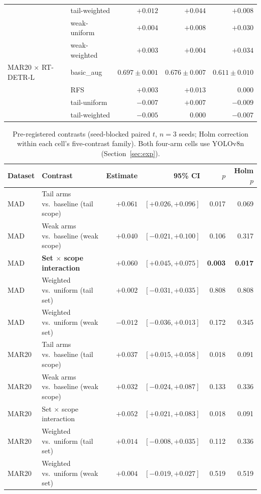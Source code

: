 \documentclass[preprint,12pt,authoryear]{elsarticle}
\begin{document}
\begin{table}[t]
\begin{tabular}{llrrr}
  & tail-weighted & $+0.012$ & $\mathbf{+0.044}$ & $+0.008$ \\
  & weak-uniform  & $+0.004$ & $+0.008$ & $\mathbf{+0.030}$ \\
  & weak-weighted & $+0.003$ & $+0.004$ & $\mathbf{+0.034}$ \\
\midrule
MAR20 $\times$ RT-DETR-L
  & basic\_aug    & $0.697\pm0.001$ & $0.676\pm0.007$ & $0.611\pm0.010$ \\
  & RFS           & $+0.003$ & $+0.013$ & $0.000$ \\
  & tail-uniform  & $-0.007$ & $\mathbf{+0.007}$ & $-0.009$ \\
  & tail-weighted & $-0.005$ & $\mathbf{0.000}$  & $-0.007$ \\
\bottomrule
\end{tabular}
\end{table}

\begin{table}[t]
\centering
\caption{Pre-registered contrasts (seed-blocked paired $t$, $n = 3$
seeds; Holm correction within each cell's five-contrast family). Both
four-arm cells use YOLOv8n (Section~\ref{sec:exp}).}
\label{tab:contrasts}
\small
\begin{tabular}{llrrrr}
\toprule
Dataset & Contrast & Estimate & 95\% CI & $p$ & Holm $p$ \\
\midrule
MAD & Tail arms vs.\ baseline (tail scope)  & $+0.061$ & $[+0.026, +0.096]$ & 0.017 & 0.069 \\
MAD & Weak arms vs.\ baseline (weak scope)  & $+0.040$ & $[-0.021, +0.100]$ & 0.106 & 0.317 \\
MAD & \textbf{Set $\times$ scope interaction} & $\mathbf{+0.060}$ & $\mathbf{[+0.045, +0.075]}$ & \textbf{0.003} & \textbf{0.017} \\
MAD & Weighted vs.\ uniform (tail set)    & $+0.002$ & $[-0.031, +0.035]$ & 0.808 & 0.808 \\
MAD & Weighted vs.\ uniform (weak set)    & $-0.012$ & $[-0.036, +0.013]$ & 0.172 & 0.345 \\
\midrule
MAR20 & Tail arms vs.\ baseline (tail scope)  & $+0.037$ & $[+0.015, +0.058]$ & 0.018 & 0.091 \\
MAR20 & Weak arms vs.\ baseline (weak scope)  & $+0.032$ & $[-0.024, +0.087]$ & 0.133 & 0.336 \\
MAR20 & Set $\times$ scope interaction & $+0.052$ & $[+0.021, +0.083]$ & 0.018 & 0.091 \\
MAR20 & Weighted vs.\ uniform (tail set)    & $+0.014$ & $[-0.008, +0.035]$ & 0.112 & 0.336 \\
MAR20 & Weighted vs.\ uniform (weak set)    & $+0.004$ & $[-0.019, +0.027]$ & 0.519 & 0.519 \\
\bottomrule
\end{tabular}
\end{table}
\end{document}
